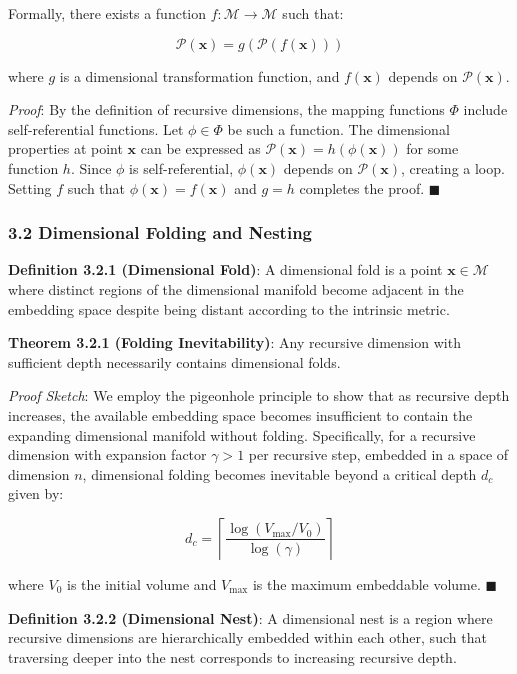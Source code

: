 \documentclass[
]{article}
\begin{document}
Formally, there exists a function
\(f: \mathcal{M} \rightarrow \mathcal{M}\) such that:

\[\mathcal{P}(\mathbf{x}) = g(\mathcal{P}(f(\mathbf{x})))\]

where \(g\) is a dimensional transformation function, and
\(f(\mathbf{x})\) depends on \(\mathcal{P}(\mathbf{x})\).

\emph{Proof}: By the definition of recursive dimensions, the mapping
functions \(\Phi\) include self-referential functions. Let
\(\phi \in \Phi\) be such a function. The dimensional properties at
point \(\mathbf{x}\) can be expressed as
\(\mathcal{P}(\mathbf{x}) = h(\phi(\mathbf{x}))\) for some function
\(h\). Since \(\phi\) is self-referential, \(\phi(\mathbf{x})\) depends
on \(\mathcal{P}(\mathbf{x})\), creating a loop. Setting \(f\) such that
\(\phi(\mathbf{x}) = f(\mathbf{x})\) and \(g = h\) completes the proof.
\(\blacksquare \)

\subsubsection{3.2 Dimensional Folding and
Nesting}\label{dimensional-folding-and-nesting}

\textbf{Definition 3.2.1 (Dimensional Fold)}: A dimensional fold is a
point \(\mathbf{x} \in \mathcal{M}\) where distinct regions of the
dimensional manifold become adjacent in the embedding space despite
being distant according to the intrinsic metric.

\textbf{Theorem 3.2.1 (Folding Inevitability)}: Any recursive dimension
with sufficient depth necessarily contains dimensional folds.

\emph{Proof Sketch}: We employ the pigeonhole principle to show that as
recursive depth increases, the available embedding space becomes
insufficient to contain the expanding dimensional manifold without
folding. Specifically, for a recursive dimension with expansion factor
\(\gamma > 1\) per recursive step, embedded in a space of dimension
\(n\), dimensional folding becomes inevitable beyond a critical depth
\(d_c\) given by:

\[d_c = \left\lceil \frac{\log(V_{\max}/V_0)}{\log(\gamma)} \right\rceil\]

where \(V_0\) is the initial volume and \(V_{\max}\) is the maximum
embeddable volume. \(\blacksquare \)

\textbf{Definition 3.2.2 (Dimensional Nest)}: A dimensional nest is a
region where recursive dimensions are hierarchically embedded within
each other, such that traversing deeper into the nest corresponds to
increasing recursive depth.
\end{document}
